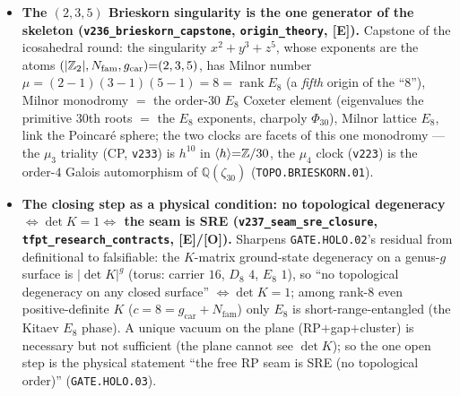 \documentclass[11pt]{article}
\providecommand{\mE}{\textbf{[E]}}\providecommand{\mC}{\textbf{[C]}}
\providecommand{\mO}{\textbf{[O]}}\providecommand{\mX}{\textbf{[X]}}
\providecommand{\vref}[1]{\texttt{#1}}
\providecommand{\gcar}{g_{\mathrm{car}}}\providecommand{\Nfam}{N_{\mathrm{fam}}}
\begin{document}
\begin{itemize}
  selection, now with holomorphy$\Leftrightarrow\det1$ a theorem (\texttt{GATE.HOLO.02}).
\item \textbf{The $(2,3,5)$ Brieskorn singularity is the one generator of the skeleton
  (\texttt{v236\_brieskorn\_capstone}, \texttt{origin\_theory}, \mE).} Capstone of the icosahedral round:
  the singularity $x^2{+}y^3{+}z^5$, whose exponents are the atoms $(|\Z_2|,\Nfam,\gcar){=}(2,3,5)$, has
  Milnor number $\mu{=}(2{-}1)(3{-}1)(5{-}1){=}8{=}\operatorname{rank}E_8$ (a \emph{fifth} origin of the
  ``$8$''), Milnor monodromy $=$ the order-$30$ $E_8$ Coxeter element (eigenvalues the primitive $30$th
  roots $=$ the $E_8$ exponents, charpoly $\Phi_{30}$), Milnor lattice $E_8$, link the Poincar\'e sphere; the
  two clocks are facets of this one monodromy --- the $\mu_3$ triality (CP, \vref{v233}) is $h^{10}$ in
  $\langle h\rangle{=}\mathbb{Z}/30$, the $\mu_4$ clock (\vref{v223}) is the order-$4$ Galois automorphism of
  $\mathbb Q(\zeta_{30})$ (\texttt{TOPO.BRIESKORN.01}).
\item \textbf{The closing step as a physical condition: no topological degeneracy $\Leftrightarrow\det K{=}1
  \Leftrightarrow$ the seam is SRE (\texttt{v237\_seam\_sre\_closure}, \texttt{tfpt\_research\_contracts},
  \mE/\mO).} Sharpens \texttt{GATE.HOLO.02}'s residual from definitional to falsifiable: the $K$-matrix
  ground-state degeneracy on a genus-$g$ surface is $|\det K|^g$ (torus: carrier $16$, $D_8$ $4$, $E_8$ $1$),
  so ``no topological degeneracy on any closed surface'' $\Leftrightarrow\det K{=}1$; among rank-$8$ even
  positive-definite $K$ ($c{=}8{=}\gcar{+}\Nfam$) only $E_8$ is short-range-entangled (the Kitaev $E_8$
  phase). A unique vacuum on the plane (RP$+$gap$+$cluster) is necessary but not sufficient (the plane
  cannot see $\det K$); so the one open step is the physical statement ``the free RP seam is SRE (no
  topological order)'' (\texttt{GATE.HOLO.03}).
\end{itemize}
\end{document}
